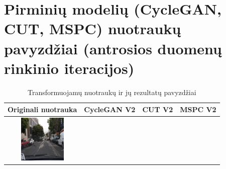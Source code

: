 \documentclass{VUMIFPSbakalaurinis}
\begin{document}
\section{Pirminių modelių (CycleGAN, CUT, MSPC) nuotraukų pavyzdžiai (antrosios duomenų rinkinio iteracijos)}
    \begin{table}[H]
        \footnotesize
        \centering
        \caption{Transformuojamų nuotraukų ir jų rezultatų pavyzdžiai}
        {\begin{tabular}{|c|c|c|c|} \hline
            Originali nuotrauka & CycleGAN V2  & CUT V2  & MSPC V2\\
            \hline
            \includegraphics[width=100,height=85]{img/pvz/1_real} & 

\end{tabular}}
\end{table}
\end{document}
